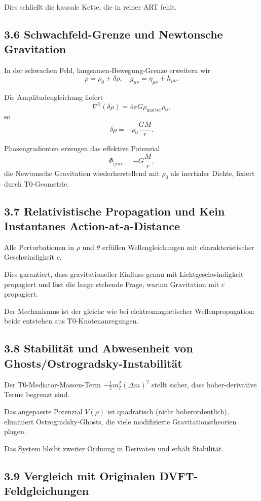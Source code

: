 	
	Dies schließt die kausale Kette, die in reiner ART fehlt.
	
	\subsection{3.6 Schwachfeld-Grenze und Newtonsche Gravitation}
	
	In der schwachen Feld, langsamen-Bewegung-Grenze erweitern wir
	\[
	\rho = \rho_0 + \delta \rho, \quad g_{\mu\nu} = \eta_{\mu\nu} + h_{\mu\nu}.
	\]
	
	Die Amplitudengleichung liefert
	\[
	\nabla^2 (\delta \rho) = 4\pi G \rho_{\text{matter}} \rho_0,
	\]
	so
	\[
	\delta \rho = -\rho_0 \frac{GM}{r}.
	\]
	
	Phasengradienten erzeugen das effektive Potenzial
	\[
	\Phi_{\text{grav}} = -G \frac{M}{r},
	\]
	die Newtonsche Gravitation wiederherstellend mit $\rho_0$ als inertialer Dichte, fixiert durch T0-Geometrie.
	
	\subsection{3.7 Relativistische Propagation und Kein Instantanes Action-at-a-Distance}
	
	Alle Perturbationen in $\rho$ und $\theta$ erfüllen Wellengleichungen mit charakteristischer Geschwindigkeit $c$.
	
	Dies garantiert, dass gravitationeller Einfluss genau mit Lichtgeschwindigkeit propagiert und löst die lange stehende Frage, warum Gravitation mit $c$ propagiert.
	
	Der Mechanismus ist der gleiche wie bei elektromagnetischer Wellenpropagation: beide entstehen aus T0-Knotenanregungen.
	
	\subsection{3.8 Stabilität und Abwesenheit von Ghosts/Ostrogradsky-Instabilität}
	
	Der T0-Mediator-Massen-Term $-\frac{1}{2} m_T^2 (\Delta m)^2$ stellt sicher, dass höher-derivative Terme begrenzt sind.
	
	Das angepasste Potenzial $V(\rho)$ ist quadratisch (nicht höherordentlich), eliminiert Ostrogradsky-Ghosts, die viele modifizierte Gravitationstheorien plagen.
	
	Das System bleibt zweiter Ordnung in Derivaten und erhält Stabilität.
	
	\subsection{3.9 Vergleich mit Originalen DVFT-Feldgleichungen}
	
